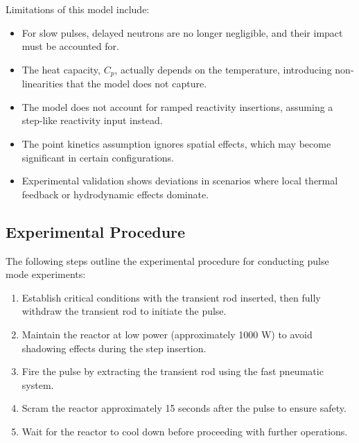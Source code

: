 Limitations of this model include:
\begin{itemize}
    \item For slow pulses, delayed neutrons are no longer negligible, and their impact must be accounted for.
    \item The heat capacity, $C_p$, actually depends on the temperature, introducing non-linearities that the model does not capture.
    \item The model does not account for ramped reactivity insertions, assuming a step-like reactivity input instead.
    \item The point kinetics assumption ignores spatial effects, which may become significant in certain configurations.
    \item Experimental validation shows deviations in scenarios where local thermal feedback or hydrodynamic effects dominate.
\end{itemize}

\subsection{Experimental Procedure}
The following steps outline the experimental procedure for conducting pulse mode experiments:
\begin{enumerate}
    \item Establish critical conditions with the transient rod inserted, then fully withdraw the transient rod to initiate the pulse.
    \item Maintain the reactor at low power (approximately 1000 W) to avoid shadowing effects during the step insertion.
    \item Fire the pulse by extracting the transient rod using the fast pneumatic system.
    \item Scram the reactor approximately 15 seconds after the pulse to ensure safety.
    \item Wait for the reactor to cool down before proceeding with further operations.
\end{enumerate}
